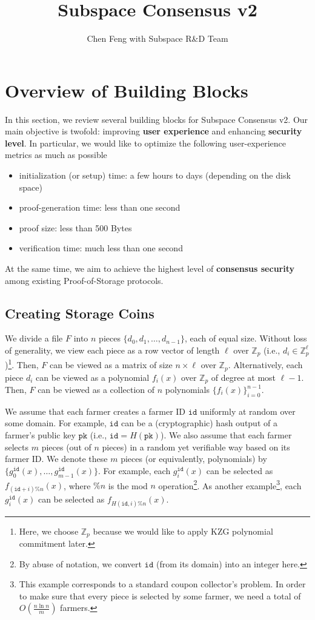 \documentclass[12pt,draftcls,onecolumn]{IEEEtran}
\title{Subspace Consensus v2}
\author{Chen Feng with Subspace R\&D Team}
\newcommand{\Fp}{\mathbb{Z}_p}
\newcommand{\pk}{\texttt{pk}}
\newcommand{\id}{\texttt{id}}
\begin{document}
\maketitle


\section{Overview of Building Blocks}

In this section, we review several building blocks for Subspace Consensus v2. 
Our main objective is twofold: improving {\bf user experience} and enhancing {\bf security level}.
In particular, we would like to optimize the following user-experience metrics as much as possible
\begin{itemize}
    \item initialization (or setup) time: a few hours to days (depending on the disk space)
    \item proof-generation time: less than one second
    \item proof size: less than 500 Bytes
    \item verification time: much less than one second
\end{itemize}
At the same time, we aim to achieve the highest level of {\bf consensus security} among existing Proof-of-Storage protocols. 

\subsection{Creating Storage Coins}

We divide a file $F$ into $n$ pieces $\{ d_0, d_1, \ldots, d_{n-1}\}$, each of equal size. 
Without loss of generality, we view each piece as a row vector of length $\ell$ over $\Fp$  (i.e., $d_i \in \Fp^\ell$)\footnote{Here, we choose $\Fp$ because we would like to apply KZG polynomial commitment later.}.
Then, $F$ can be viewed as a matrix of size $n \times \ell$ over $\Fp$.
Alternatively, each piece $d_i$ can be viewed as a polynomial $f_i(x)$ over $\Fp$ of degree at most $\ell - 1$. 
Then, $F$ can be viewed as a collection of $n$ polynomials $\{ f_i(x) \}_{i = 0}^{n-1}$. 

We assume that each farmer creates a farmer ID $\id$ uniformly at random over some domain. For example, $\id$ can be a (cryptographic) hash output of a farmer's public key $\pk$ (i.e., $\id = H(\pk)$).
We also assume that each farmer selects $m$ pieces (out of $n$ pieces) in a random yet verifiable way based on its farmer ID.
We denote these $m$ pieces (or equivalently, polynomials) by $\{g_0^{\id}(x), \ldots, g_{m-1}^{\id}(x) \}$.
For example, each $g_i^{\id}(x)$ can be selected as $f_{(\id + i)\% n}(x)$, where $\% n$ is the mod $n$ operation\footnote{By abuse of notation, we convert $\id$ (from its domain) into an integer here.}.
As another example\footnote{This example corresponds to a standard coupon collector's problem. In order to make sure that every piece is selected by some farmer, we need a total of $O\left( \frac{n \ln n}{m} \right)$ farmers.}, each $g_i^{\id}(x)$ can be selected as $f_{H(\id, i)\% n}(x)$.
\end{document}
